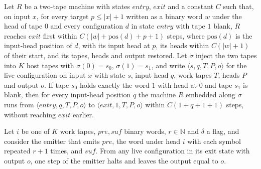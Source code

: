 \begin{theorem}
\label{Turing.NTimeDiag.qy_seekHost}
\leanok
{}
Let $R$ be a two-tape machine with states $\mathit{entry}$, $\mathit{exit}$ and a constant $C$
such that, on input $x$, for every target $p \le |x| + 1$ written as a binary word $w$ under the
head of tape $0$ and every configuration $d$ in state $\mathit{entry}$ with tape $1$ blank, $R$
reaches $\mathit{exit}$ first within $C(|w| + \mathrm{pos}(d) + p + 1)$ steps, where
$\mathrm{pos}(d)$ is the input-head position of $d$, with its input head at $p$, its heads within
$C(|w| + 1)$ of their start, and its tapes, heads and output restored. Let $\sigma$ inject the two
tapes into $K$ host tapes with $\sigma(0) = s_0$, $\sigma(1) = s_1$, and write
$\langle s, q, T, P, o\rangle$ for the live configuration on input $x$ with state $s$, input head
$q$, work tapes $T$, heads $P$ and output $o$. If tape $s_0$ holds exactly the word $1$ with head
at $0$ and tape $s_1$ is blank, then for every input-head position $q$ the machine $R$ embedded
along $\sigma$ runs from $\langle \mathit{entry}, q, T, P, o\rangle$ to
$\langle \mathit{exit}, 1, T, P, o\rangle$ within $C(1 + q + 1 + 1)$ steps, without reaching
$\mathit{exit}$ earlier.
\end{theorem}

\begin{theorem}
\label{Turing.NTimeDiag.qy_emit_halt}
\leanok
{}
Let $i$ be one of $K$ work tapes, $\mathit{pre}, \mathit{suf}$ binary words, $r \in \mathbb{N}$
and $\delta$ a flag, and consider the emitter that emits $\mathit{pre}$, the word under head $i$
with each symbol repeated $r + 1$ times, and $\mathit{suf}$. From any live configuration in its
exit state with output $o$, one step of the emitter halts and leaves the output equal to $o$.
\end{theorem}

